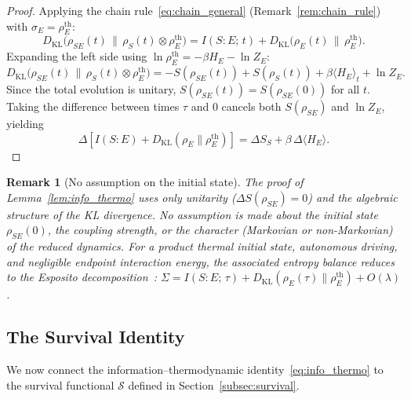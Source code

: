 \documentclass[12pt]{article}
\newtheorem{remark}[theorem]{Remark}
\begin{document}
\begin{proof}
Applying the chain rule~\eqref{eq:chain_general}
(Remark~\ref{rem:chain_rule}) with
$\sigma_E = \rho_E^{\mathrm{th}}$:
\begin{equation}
\label{eq:chain_step}
D_{\mathrm{KL}}\!\bigl(\rho_{SE}(t) \,\big\|\,
  \rho_S(t) \otimes \rho_E^{\mathrm{th}}\bigr)
= I(S{:}E;\, t)
  + D_{\mathrm{KL}}\!\bigl(\rho_E(t) \,\big\|\,
    \rho_E^{\mathrm{th}}\bigr).
\end{equation}
Expanding the left side using
$\ln\rho_E^{\mathrm{th}} = -\beta H_E - \ln Z_E$:
\begin{equation}
\label{eq:phi_expand}
D_{\mathrm{KL}}\!\bigl(\rho_{SE}(t) \,\big\|\,
  \rho_S(t) \otimes \rho_E^{\mathrm{th}}\bigr)
= -S(\rho_{SE}(t)) + S(\rho_S(t))
  + \beta\langle H_E \rangle_t + \ln Z_E.
\end{equation}
Since the total evolution is unitary,
$S(\rho_{SE}(t)) = S(\rho_{SE}(0))$ for all $t$.
Taking the difference between times $\tau$ and $0$ cancels
both $S(\rho_{SE})$ and $\ln Z_E$, yielding
\begin{equation}
\Delta\!\left[I(S{:}E)
  + D_{\mathrm{KL}}(\rho_E \| \rho_E^{\mathrm{th}})\right]
= \Delta S_S + \beta\,\Delta\langle H_E \rangle.
\end{equation}
\end{proof}

\begin{remark}[No assumption on the initial state]
\label{rem:no_product_lemma}
The proof of Lemma~\ref{lem:info_thermo} uses \emph{only}
unitarity ($\Delta S(\rho_{SE}) = 0$) and the algebraic
structure of the KL divergence.
No assumption is made about the initial state $\rho_{SE}(0)$,
the coupling strength, or the character (Markovian or
non-Markovian) of the reduced dynamics.
For a product thermal initial state, autonomous driving, and negligible
endpoint interaction energy, the associated entropy balance reduces to
the Esposito decomposition~\cite{EspositoLindenbergVandenBroeck2010}:
$\Sigma = I(S{:}E;\,\tau)
+ D_{\mathrm{KL}}(\rho_E(\tau) \| \rho_E^{\mathrm{th}})
+O(\lambda)$.
\end{remark}

\subsection{The Survival Identity}

We now connect the information--thermodynamic
identity~\eqref{eq:info_thermo} to the survival
functional $\mathcal{S}$ defined in
Section~\ref{subsec:survival}.
\end{document}
